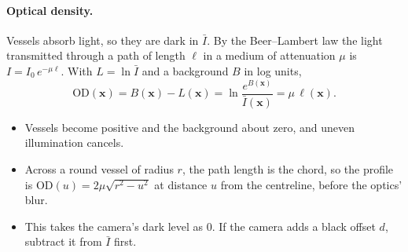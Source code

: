 \documentclass[11pt]{article}
\newcommand{\x}{\mathbf{x}}
\newcommand{\OD}{\mathrm{OD}}
\begin{document}
\paragraph{Optical density.} Vessels absorb light, so they are dark in $\bar I$. By the Beer--Lambert law the light
transmitted through a path of length $\ell$ in a medium of attenuation $\mu$ is $I = I_0\, e^{-\mu \ell}$. With
$L = \ln \bar I$ and a background $B$ in log units,
\begin{equation}
  \OD(\x) = B(\x) - L(\x) = \ln \frac{e^{B(\x)}}{\bar I(\x)} = \mu\, \ell(\x).
\end{equation}
\begin{itemize}
  \item Vessels become positive and the background about zero, and uneven illumination cancels.
  \item Across a round vessel of radius $r$, the path length is the chord, so the profile is
        $\OD(u) = 2\mu\sqrt{r^2 - u^2}$ at distance $u$ from the centreline, before the optics' blur.
  \item This takes the camera's dark level as 0. If the camera adds a black offset $d$, subtract it from $\bar I$
        first.
\end{itemize}
\end{document}
